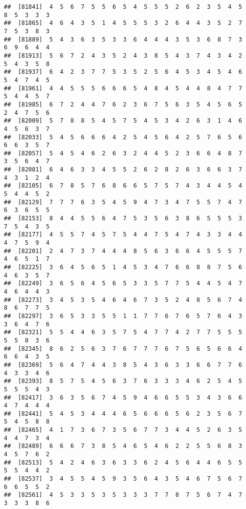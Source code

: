 \documentclass[
]{book}
\begin{document}
\begin{verbatim}
##  [81841]  4  5  6  7  5  5  6  5  4  5  5  5  2  6  2  3  5  4  5  8  5  3  3  3
##  [81865]  4  6  4  3  5  1  4  5  5  5  3  2  6  4  4  3  5  2  7  7  5  3  8  3
##  [81889]  5  4  3  6  3  5  3  3  6  4  4  4  3  5  3  6  8  7  3  6  9  6  4  4
##  [81913]  5  6  7  2  4  3  5  2  4  3  8  5  4  3  7  4  3  4  2  5  4  3  5  8
##  [81937]  6  4  2  3  7  7  5  3  5  2  5  6  4  5  3  4  5  4  6  5  4  7  4  5
##  [81961]  4  4  5  5  5  6  6  6  5  4  8  4  5  4  4  8  4  7  7  5  4  4  5  7
##  [81985]  6  7  2  4  4  7  6  2  3  6  7  5  6  3  5  4  5  6  5  2  4  7  5  6
##  [82009]  5  7  8  8  5  4  5  7  5  4  5  3  4  2  6  3  1  4  6  4  5  6  3  7
##  [82033]  5  4  5  6  6  6  4  2  5  4  5  6  4  2  5  7  6  5  6  6  6  3  5  7
##  [82057]  5  4  5  4  6  2  6  3  2  4  4  5  2  3  6  6  4  8  7  3  5  6  4  7
##  [82081]  6  4  6  3  3  4  5  5  2  6  2  8  2  6  3  6  6  3  7  4  3  1  2  4
##  [82105]  6  7  8  5  7  6  8  6  6  5  7  5  7  4  3  4  4  5  4  5  4  4  5  2
##  [82129]  7  7  7  6  3  5  4  5  9  4  7  3  4  7  5  5  7  4  7  6  3  6  5  5
##  [82153]  8  4  4  5  5  6  4  7  5  3  5  6  3  8  6  5  5  5  3  7  5  4  3  5
##  [82177]  4  5  5  7  4  5  7  5  4  4  7  5  4  7  4  3  3  4  4  4  7  5  9  4
##  [82201]  2  4  7  3  7  4  4  4  8  5  6  3  6  6  4  5  5  5  7  4  6  5  1  7
##  [82225]  3  6  4  5  6  5  1  4  5  3  4  7  6  6  8  8  7  5  6  4  6  3  5  7
##  [82249]  3  6  5  6  4  5  6  5  3  3  5  7  7  5  4  4  5  4  7  4  6  4  4  3
##  [82273]  3  4  5  3  5  4  6  4  6  7  3  5  2  4  8  5  6  7  4  8  6  7  7  5
##  [82297]  3  6  5  3  3  5  5  1  1  7  7  6  7  6  5  7  6  4  3  3  6  4  7  6
##  [82321]  5  5  4  4  6  3  5  7  5  4  7  7  4  2  7  7  5  5  5  5  5  8  3  6
##  [82345]  8  6  2  5  6  3  7  6  7  7  7  6  7  5  6  5  6  6  4  6  6  4  3  5
##  [82369]  5  6  4  7  4  4  3  8  5  4  3  6  3  3  6  6  7  7  6  4  3  3  4  6
##  [82393]  8  5  7  5  4  5  6  3  7  6  3  3  3  4  6  2  5  4  5  5  5  5  4  3
##  [82417]  3  6  3  5  6  7  4  5  9  4  6  6  5  5  3  4  3  6  6  4  7  4  4  4
##  [82441]  5  4  5  3  4  4  4  6  5  6  6  6  5  6  2  3  5  6  7  5  4  5  8  8
##  [82465]  4  1  7  3  6  7  3  5  6  7  7  3  4  4  5  2  6  3  5  4  4  7  3  4
##  [82489]  6  6  6  7  3  8  5  4  6  5  4  6  2  2  5  5  6  8  3  4  5  7  6  2
##  [82513]  5  4  2  4  6  3  6  3  3  6  2  4  5  6  4  4  6  5  5  5  5  4  4  2
##  [82537]  3  4  5  5  4  5  9  3  5  6  4  3  5  4  6  7  5  6  7  6  6  5  5  2
##  [82561]  4  5  3  3  5  3  5  3  3  3  7  7  8  7  5  6  7  4  7  3  3  3  8  6

\end{verbatim}
\end{document}
